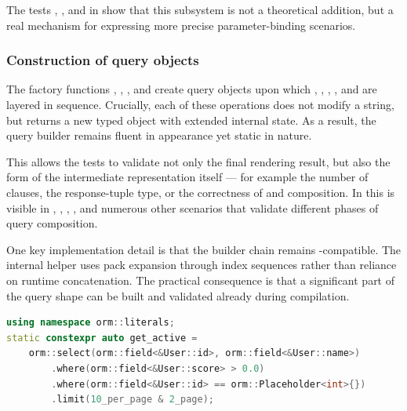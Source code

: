 The tests , , and  in  show that this subsystem is not a theoretical addition, but a real mechanism for expressing more precise parameter-binding scenarios.

\subsubsection{Construction of query objects}

The factory functions , , , and  create query objects upon which , , , , and  are layered in sequence. Crucially, each of these operations does not modify a string, but returns a new typed object with extended internal state. As a result, the query builder remains fluent in appearance yet static in nature.

This allows the tests to validate not only the final rendering result, but also the form of the intermediate representation itself --- for example the number of  clauses, the response-tuple type, or the correctness of  and  composition. In  this is visible in , , , , and numerous other scenarios that validate different phases of query composition.

One key implementation detail is that the builder chain remains -compatible. The internal helper  uses pack expansion through index sequences rather than reliance on runtime concatenation. The practical consequence is that a significant part of the query shape can be built and validated already during compilation.

\begin{lstlisting}[language=C++,caption={Query object declared as a compile-time constant},label={lst:constexpr_query}]
using namespace orm::literals;
static constexpr auto get_active =
    orm::select(orm::field<&User::id>, orm::field<&User::name>)
        .where(orm::field<&User::score> > 0.0)
        .where(orm::field<&User::id> == orm::Placeholder<int>{})
        .limit(10_per_page & 2_page);
\end{lstlisting}


